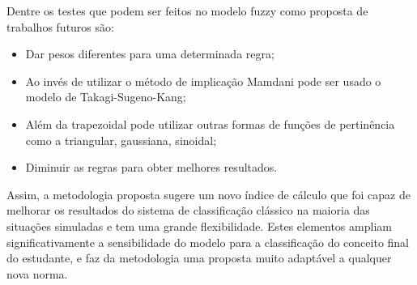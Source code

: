 \documentclass{article}
\begin{document}
Dentre os testes que podem ser feitos no modelo fuzzy como
proposta de trabalhos futuros são:

\begin{itemize}
    \item Dar pesos diferentes para uma determinada regra;
    \item Ao invés de utilizar o método de implicação
Mamdani pode ser usado o modelo de Takagi-Sugeno-Kang;
    \item Além da trapezoidal pode utilizar outras formas de
    funções de pertinência como a triangular, gaussiana,
    sinoidal;
    \item Diminuir as regras para obter melhores resultados.
\end{itemize}

Assim, a metodologia proposta sugere um novo índice de
cálculo que foi capaz de melhorar os resultados do sistema
de classificação clássico na maioria das situações
simuladas e tem uma grande flexibilidade. Estes elementos
ampliam significativamente a sensibilidade do modelo para
a classificação do conceito final do estudante, e faz da
metodologia uma proposta muito adaptável a qualquer nova norma.





\end{document}
